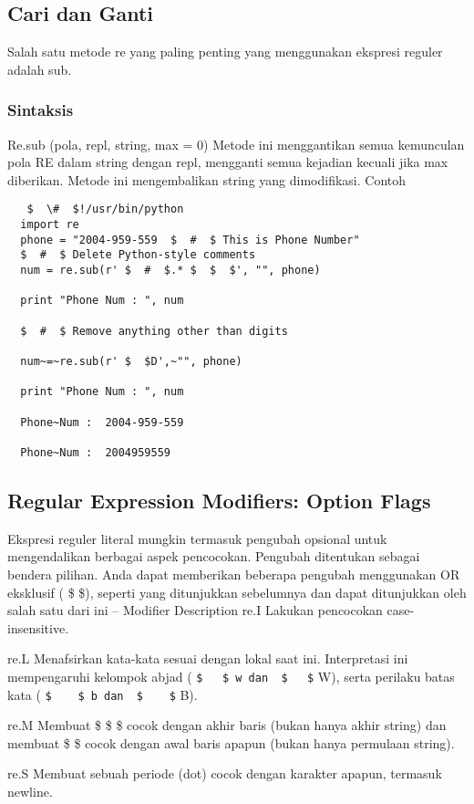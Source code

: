 \begin {enumerate}
\begin {enumerate}
\subsection{Cari dan Ganti}
Salah satu metode re yang paling penting yang menggunakan ekspresi reguler adalah sub.
  \subsubsection{Sintaksis}
  Re.sub (pola, repl, string, max = 0)
  Metode ini menggantikan semua kemunculan pola RE dalam string dengan repl, mengganti semua kejadian kecuali jika max diberikan. Metode ini mengembalikan string yang dimodifikasi.
  Contoh
  \begin{verbatim}
   $  \#  $!/usr/bin/python
  import re
  phone = "2004-959-559  $  #  $ This is Phone Number"
  $  #  $ Delete Python-style comments
  num = re.sub(r' $  #  $.* $  $  $', "", phone)

  print "Phone Num : ", num

  $  #  $ Remove anything other than digits

  num~=~re.sub(r' $  $D',~"", phone)

  print "Phone Num : ", num

  Phone~Num :  2004-959-559

  Phone~Num :  2004959559
  \end{verbatim}

\subsection{Regular Expression Modifiers: Option Flags}
Ekspresi reguler literal mungkin termasuk pengubah opsional untuk mengendalikan berbagai aspek pencocokan. Pengubah ditentukan sebagai bendera pilihan. Anda dapat memberikan beberapa pengubah menggunakan OR eksklusif ( \$   \$), seperti yang ditunjukkan sebelumnya dan dapat ditunjukkan oleh salah satu dari ini – Modifier Description
re.I
Lakukan pencocokan case-insensitive.

re.L
Menafsirkan kata-kata sesuai dengan lokal saat ini. Interpretasi ini mempengaruhi kelompok abjad ( \verb|$   $ w dan  $   $| W), serta perilaku batas kata ( \verb|$    $ b dan  $    $| B).

re.M
Membuat  \$  \$  \$ cocok dengan akhir baris (bukan hanya akhir string) dan membuat  \$   \$ cocok dengan awal baris apapun (bukan hanya permulaan string).

re.S
Membuat sebuah periode (dot) cocok dengan karakter apapun, termasuk newline.


\end{enumerate}
\end{enumerate}
